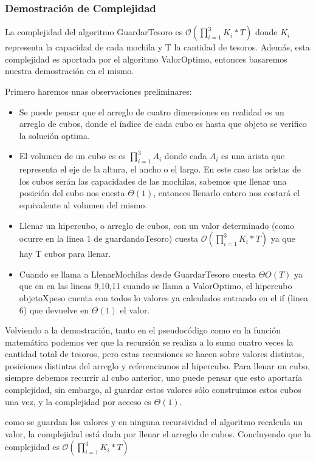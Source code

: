 \documentclass[spanish,12pt]{article}
\begin{document}
{\subsubsection{Demostración de Complejidad}

La complejidad del algoritmo GuardarTesoro es $\mathcal{O}(\prod_{i=1}^{3}K_{i} * T)$ donde $K_i$ representa la capacidad de cada mochila y T la cantidad de tesoros. Además, esta complejidad es aportada por el algoritmo ValorOptimo, entonces basaremos nuestra demostración en el mismo.

Primero haremos unas observaciones preliminares:
\begin{itemize}
	\item Se puede pensar que el arreglo de cuatro dimensiones en realidad es un arreglo de cubos, donde el índice de cada cubo es hasta que objeto se verifico la solución optima.
	\item El volumen de un cubo es es $\prod_{i=1}^{3}A_{i}$ donde cada $A_i$ es una arista que representa el eje de la altura, el ancho o el largo. En este caso las aristas de los cubos serán las capacidades de las mochilas, sabemos que llenar una posición del cubo nos cuesta $\Theta(1)$, entonces llenarlo entero nos costará el equivalente al volumen del mismo.
	\item Llenar un hipercubo, o arreglo de cubos, con un valor determinado (como ocurre en la linea 1 de guardandoTesoro) cuesta $\mathcal{O}(\prod_{i=1}^{3}K_{i} * T)$ ya que hay T cubos para llenar.
	\item Cuando se llama a LlenarMochilas desde GuardarTesoro cuesta $\Theta{O}(T)$ ya que en en las lineas 9,10,11 cuando se llama a ValorOptimo, el hipercubo objetoXpeso cuenta con todos lo valores ya calculados entrando en el if (linea 6) que devuelve en $\Theta(1)$ el valor.
\end{itemize}

Volviendo a la demostración, tanto en el pseudocódigo como en la función matemática podemos ver que la recursión se realiza a lo sumo cuatro veces la cantidad total de tesoros, pero estas recursiones se hacen sobre valores distintos, posiciones distintas del arreglo y referenciamos al hipercubo. Para llenar un cubo, siempre debemos recurrir al cubo anterior, uno puede pensar que esto aportaría complejidad, sin embargo, al guardar estos valores sólo construimos estos cubos una vez, y la complejidad por acceso es $\Theta(1)$.

como se guardan los valores y en ninguna recursividad  el algoritmo recalcula un valor, la complejidad está dada por llenar el arreglo de cubos. Concluyendo que la complejidad es $\mathcal{O}(\prod_{i=1}^{3}K_{i} * T)$

}
\end{document}
